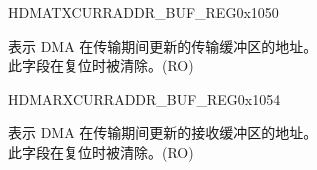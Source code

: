 \begin{register}{H}{DMATXCURRADDR\_BUF\_REG}{0x1050}\label{regdesc:DMATXCURRADDRBUFREG}
%
\regnewline%
\begin{regdesc}\begin{reglist}
\item [TRANS\_BUFF\_ADDR\_PTR] 表示 DMA 在传输期间更新的传输缓冲区的地址。\\
此字段在复位时被清除。(RO)
\end{reglist}\end{regdesc}
\end{register}

\begin{register}{H}{DMARXCURRADDR\_BUF\_REG}{0x1054}\label{regdesc:DMARXCURRADDRBUFREG}
%
\regnewline%
\begin{regdesc}\begin{reglist}
\item [RECV\_BUFF\_ADDR\_PTR] 表示 DMA 在传输期间更新的接收缓冲区的地址。\\
此字段在复位时被清除。(RO)
\end{reglist}\end{regdesc}
\end{register}


